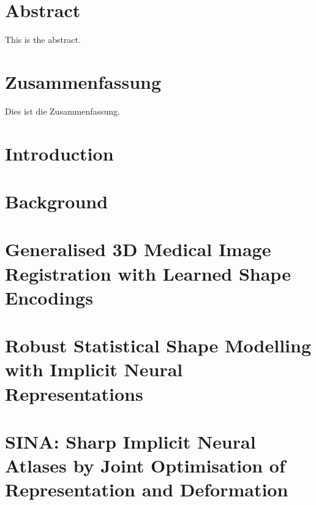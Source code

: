 \documentclass[11pt, a4paper, oneside, headsepline, titlepage, DIV=11, BCOR=12mm, captions=tableheading, chapterprefix=on, numbers=noenddot]{scrbook}
\begin{document}
    \thispagestyle{headings}
    

    \enlargethispage{1\baselineskip}
    \setcounter{page}{1}

    \chapter*{Abstract} %
        This is the abstract.
    \cleardoublepage

    \chapter*{Zusammenfassung} %
        Dies ist die Zusammenfassung.
    \cleardoublepage

    \tableofcontents
    \cleardoublepage

    \chapter{Introduction} %
        \label{chap:introduction}
        

    \chapter{Background} %
        \label{chap:background}
        


    \chapter{Generalised 3D Medical Image Registration with Learned Shape Encodings}
    \label{chap:MIUA24}


    \chapter{Robust Statistical Shape Modelling with Implicit Neural Representations}
    \label{chap:BVM25}

    \chapter[SINA: Sharp Implicit Neural Atlases]{SINA: Sharp Implicit Neural Atlases by Joint Optimisation of Representation and Deformation}
    \label{chap:WBIR24}
\end{document}
